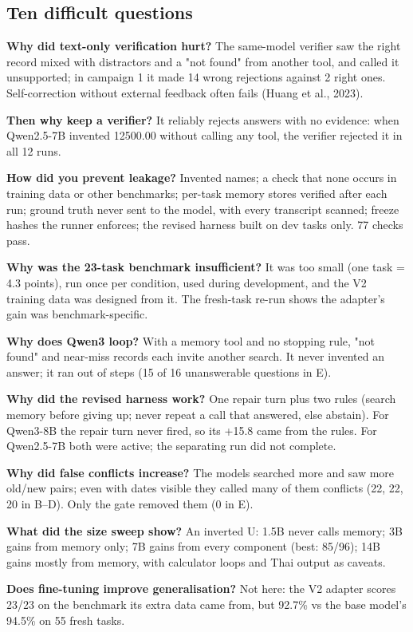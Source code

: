 \documentclass[10pt,a4paper]{article}
\begin{document}
\subsection*{Ten difficult questions}
\textbf{Why did text-only verification hurt?} The same-model verifier saw the right record mixed with distractors and a "not found" from another tool, and called it unsupported; in campaign 1 it made 14 wrong rejections against 2 right ones. Self-correction without external feedback often fails (Huang et al., 2023).

\textbf{Then why keep a verifier?} It reliably rejects answers with no evidence: when Qwen2.5-7B invented 12500.00 without calling any tool, the verifier rejected it in all 12 runs.

\textbf{How did you prevent leakage?} Invented names; a check that none occurs in training data or other benchmarks; per-task memory stores verified after each run; ground truth never sent to the model, with every transcript scanned; freeze hashes the runner enforces; the revised harness built on dev tasks only. 77 checks pass.

\textbf{Why was the 23-task benchmark insufficient?} It was too small (one task = 4.3 points), run once per condition, used during development, and the V2 training data was designed from it. The fresh-task re-run shows the adapter's gain was benchmark-specific.

\textbf{Why does Qwen3 loop?} With a memory tool and no stopping rule, "not found" and near-miss records each invite another search. It never invented an answer; it ran out of steps (15 of 16 unanswerable questions in E).

\textbf{Why did the revised harness work?} One repair turn plus two rules (search memory before giving up; never repeat a call that answered, else abstain). For Qwen3-8B the repair turn never fired, so its +15.8 came from the rules. For Qwen2.5-7B both were active; the separating run did not complete.

\textbf{Why did false conflicts increase?} The models searched more and saw more old/new pairs; even with dates visible they called many of them conflicts (22, 22, 20 in B–D). Only the gate removed them (0 in E).

\textbf{What did the size sweep show?} An inverted U: 1.5B never calls memory; 3B gains from memory only; 7B gains from every component (best: 85/96); 14B gains mostly from memory, with calculator loops and Thai output as caveats.

\textbf{Does fine-tuning improve generalisation?} Not here: the V2 adapter scores 23/23 on the benchmark its extra data came from, but 92.7\% vs the base model's 94.5\% on 55 fresh tasks.
\end{document}
